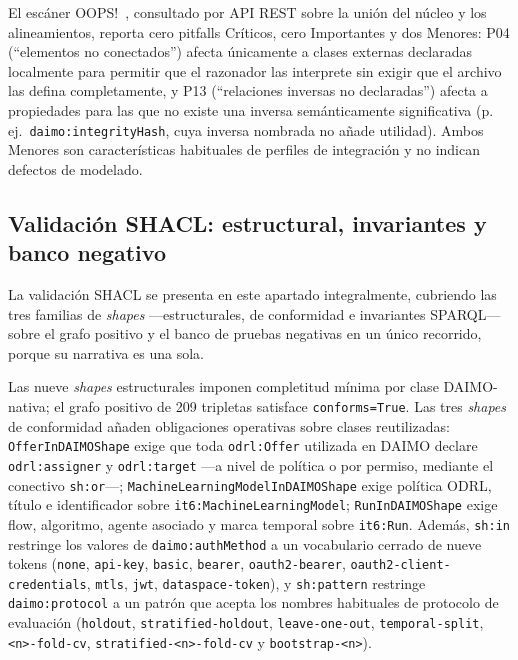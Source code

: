 \documentclass[11pt,a4paper]{article}
\newcommand{\code}[1]{\texttt{#1}}
\begin{document}
El escáner OOPS!~\cite{oops14}, consultado por API REST sobre la unión del núcleo y los alineamientos, reporta cero pitfalls Críticos, cero Importantes y dos Menores: P04 (``elementos no conectados'') afecta únicamente a clases externas declaradas localmente para permitir que el razonador las interprete sin exigir que el archivo las defina completamente, y P13 (``relaciones inversas no declaradas'') afecta a propiedades para las que no existe una inversa semánticamente significativa (p.\,ej.\ \code{daimo:integrityHash}, cuya inversa nombrada no añade utilidad). Ambos Menores son características habituales de perfiles de integración y no indican defectos de modelado.

\subsection{Validación SHACL: estructural, invariantes y banco negativo}\label{sec:eval-invariants}

La validación SHACL se presenta en este apartado integralmente, cubriendo las tres familias de \emph{shapes} ---estructurales, de conformidad e invariantes SPARQL--- sobre el grafo positivo y el banco de pruebas negativas en un único recorrido, porque su narrativa es una sola.

Las nueve \emph{shapes} estructurales imponen completitud mínima por clase DAIMO-nativa; el grafo positivo de 209 tripletas satisface \texttt{conforms=True}. Las tres \emph{shapes} de conformidad añaden obligaciones operativas sobre clases reutilizadas: \code{OfferInDAIMOShape} exige que toda \code{odrl:Offer} utilizada en DAIMO declare \code{odrl:assigner} y \code{odrl:target} ---a nivel de política o por permiso, mediante el conectivo \code{sh:or}---; \code{MachineLearningModelInDAIMOShape} exige política ODRL, título e identificador sobre \code{it6:MachineLearningModel}; \code{RunInDAIMOShape} exige flow, algoritmo, agente asociado y marca temporal sobre \code{it6:Run}. Además, \code{sh:in} restringe los valores de \code{daimo:authMethod} a un vocabulario cerrado de nueve tokens (\texttt{none}, \texttt{api-key}, \texttt{basic}, \texttt{bearer}, \texttt{oauth2-bearer}, \texttt{oauth2-client-credentials}, \texttt{mtls}, \texttt{jwt}, \texttt{dataspace-token}), y \code{sh:pattern} restringe \code{daimo:protocol} a un patrón que acepta los nombres habituales de protocolo de evaluación (\texttt{holdout}, \texttt{stratified-holdout}, \texttt{leave-one-out}, \texttt{temporal-split}, \texttt{<n>-fold-cv}, \texttt{stratified-<n>-fold-cv} y \texttt{bootstrap-<n>}).
\end{document}
